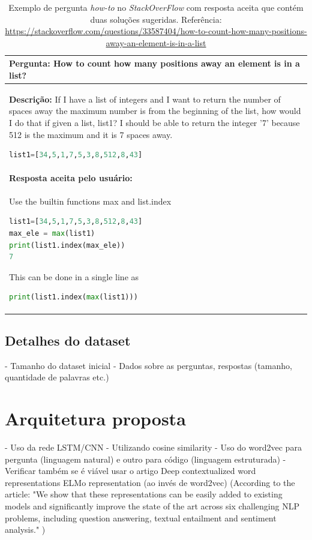 \begin{table}[h!]
\centering
\begin{tabular}{ |p{14cm}| } 
 \hline
 \textbf{Pergunta:} How to count how many positions away an element is in a list? \\ \hline
 \textbf{Descrição:} If I have a list of integers and I want to return the number of spaces away the maximum number is from the beginning of the list, how would I do that if given a list, list1? I should be able to return the integer '7' because 512 is the maximum and it is 7 spaces away.
 
\begin{lstlisting}[language=python]
list1=[34,5,1,7,5,3,8,512,8,43]
\end{lstlisting}

 \\ \hline
 \textbf{Resposta aceita pelo usuário:}\\ 
 \hline
 Use the builtin functions max and list.index
\begin{lstlisting}[language=python]
list1=[34,5,1,7,5,3,8,512,8,43]
max_ele = max(list1)
print(list1.index(max_ele))
7
\end{lstlisting}
This can be done in a single line as
\begin{lstlisting}[language=python]
print(list1.index(max(list1)))
\end{lstlisting}
\\
 
 \hline
\end{tabular}
\caption{Exemplo de pergunta \textit{how-to} no \textit{StackOverFlow} com resposta aceita que contém duas soluções sugeridas. Referência: \url{https://stackoverflow.com/questions/33587404/how-to-count-how-many-positions-away-an-element-is-in-a-list}}
\label{table:exemplo-pergunta-stack-over-flow-howto-two-code-solutions}
\end{table}



\subsection{Detalhes do dataset}

 - Tamanho do dataset inicial
 - Dados sobre as perguntas, respostas (tamanho, quantidade de palavras etc.)

\section{Arquitetura proposta} 

- Uso da rede LSTM/CNN 
       - Utilizando cosine similarity
       - Uso do word2vec para pergunta (linguagem natural) e outro para código (linguagem estruturada) - Verificar também se é viável usar o artigo Deep contextualized word representations ELMo representation (ao invés de word2vec) (According to the article: "We show that
these representations can be easily added to
existing models and significantly improve the
state of the art across six challenging NLP
problems, including question answering, textual entailment and sentiment analysis." )





